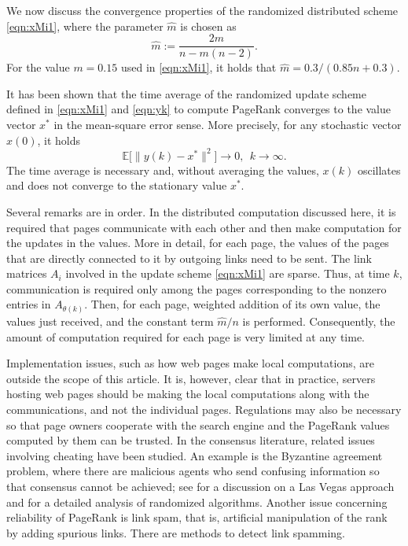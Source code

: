 \documentclass[11pt,draftcls,onecolumn]{IEEEtran}
\newcommand{\field}[1]{{\mathbb{#1}}}
\newcommand{\E}{\field{E}}
\begin{document}
We now discuss 
the convergence properties of the randomized distributed scheme \eqref{eqn:xMi1}, 
where the parameter $\hat{m}$ is chosen as
\begin{equation*}
   \hat{m} := \frac{2m}{n - m(n-2)}.
\end{equation*}
For the value $m=0.15$ used in \eqref{eqn:xMi1},
it holds that $\hat{m} = 0.3/(0.85n+0.3)$. 

It has been shown \cite{IshTem:10} that the time average of the randomized 
update scheme defined in \eqref{eqn:xMi1} and \eqref{eqn:yk} to compute PageRank 
converges to the value vector $x^*$ in the mean-square error sense. 
More precisely, for any stochastic vector $x(0)$, it holds
$$
\E\bigl[
   \bigl\|
      y(k) - x^*
   \bigr\|^2
  \bigr] \rightarrow 0,~~k\rightarrow\infty.
$$
The time average is necessary and, without averaging the values, 
$x(k)$ oscillates and does not converge to the stationary value $x^*$.

Several remarks are in order. 
In the distributed computation discussed here,
it is required that pages communicate with each other and 
then make computation for the updates in the values. 
More in detail, for each page, the values of the 
pages that are directly connected to it by outgoing links need to be
sent. The link matrices $A_i$ involved in the update scheme \eqref{eqn:xMi1}
are sparse. Thus, at time $k$, communication 
is required only among the pages corresponding to the nonzero entries
in $A_{\theta(k)}$. 
Then, for each page, weighted addition of its own value, the values 
just received, and the constant term $\hat{m}/n$ is performed.
Consequently, the amount of computation required 
for each page is very limited at any time.

Implementation issues, such as how web pages 
make local computations, are outside the scope of this article. 
It is, however, clear that in practice, servers hosting web pages should be making the
local computations along with the communications, and not the individual pages.
Regulations may also be necessary so that page owners cooperate with the 
search engine and the PageRank values computed by them 
can be trusted. In the consensus literature, related issues 
involving cheating have been studied. 
An example is the Byzantine agreement problem,
where there are malicious agents who send
confusing information so that 
consensus cannot be achieved; see \cite{TemIsh:07} for a discussion
on a Las Vegas approach and \cite{TemCalDab_book} 
for a detailed analysis of randomized algorithms.
Another issue concerning reliability of PageRank is link spam, that is,
artificial manipulation of the rank by adding spurious links.  
There are methods \cite{LanMey:06,AndBorHop:07}
to detect link spamming.
\end{document}

